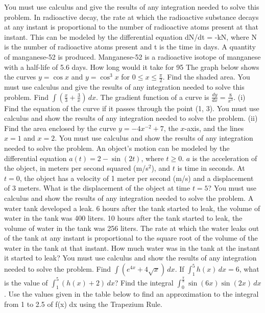 \documentclass[12pt,addpoints]{exam}
\begin{document}
\begin{questions}
You must use calculus and give the results of any integration needed to solve this problem.
\fillwithlines{5cm}
\question[5] In radioactive decay, the rate at which the radioactive substance decays at any instant is proportional to the number of radioactive atoms present at that instant. This can be modeled by the differential equation dN/dt = -kN, where N is the number of radioactive atoms present and t is the time in days. A quantity of manganese-52 is produced. Manganese-52 is a radioactive isotope of manganese with a half-life of 5.6 days. How long would it take for 95%
\fillwithlines{5cm}
\question[5] The graph below shows the curves \( y = \cos x \) and \( y = \cos^3 x \) for \( 0 \leq x \leq \frac{\pi}{2} \). Find the shaded area. You must use calculus and give the results of any integration needed to solve this problem.
\fillwithlines{5cm}
\question[5] Find \(\int \left( \frac{x}{3} + \frac{3}{x} \right) \, dx\).
\fillwithlines{5cm}
\question[5] The gradient function of a curve is \( \frac{dy}{dx} = \frac{8}{x^3} \). (i) Find the equation of the curve if it passes through the point (1, 3). You must use calculus and show the results of any integration needed to solve the problem.
\fillwithlines{5cm}
\question[5] (ii) Find the area enclosed by the curve \( y = -4x^{-2} + 7 \), the \(x\)-axis, and the lines \(x = 1\) and \(x = 2\). You must use calculus and show the results of any integration needed to solve the problem.
\fillwithlines{5cm}
\question[5] An object's motion can be modeled by the differential equation \( a(t) = 2 - \sin(2t) \), where \( t \geq 0 \). \( a \) is the acceleration of the object, in meters per second squared (m/s\(^2\)), and \( t \) is time in seconds. At \( t = 0 \), the object has a velocity of 1 meter per second (m/s) and a displacement of 3 meters. What is the displacement of the object at time \( t = 5 \)? You must use calculus and show the results of any integration needed to solve the problem.
\fillwithlines{5cm}
\question[5] A water tank developed a leak. 6 hours after the tank started to leak, the volume of water in the tank was 400 liters. 10 hours after the tank started to leak, the volume of water in the tank was 256 liters. The rate at which the water leaks out of the tank at any instant is proportional to the square root of the volume of the water in the tank at that instant. How much water was in the tank at the instant it started to leak? You must use calculus and show the results of any integration needed to solve the problem.
\fillwithlines{5cm}
\question[5] Find \(\int (e^{4x} + 4\sqrt{x}) \, dx\).
\fillwithlines{5cm}
\question[5] If \(\int_1^5 h(x) \, dx = 6\), what is the value of \(\int_1^5 (h(x) + 2) \, dx\)?
\fillwithlines{5cm}
\question[5] Find the integral \(\int_0^{\frac{\pi}{8}} \sin(6x) \sin(2x) \, dx\).
\fillwithlines{5cm}
\question[5] Use the values given in the table below to find an approximation to the integral from 1 to 2.5 of f(x) dx using the Trapezium Rule.


\end{questions}
\end{document}
